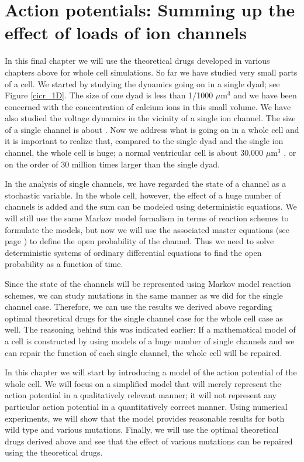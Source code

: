 \chapter[Whole cell action potentials]{Action potentials: Summing up the effect of loads of ion channels \label{ap}}
    
    In this final chapter we will use the theoretical drugs developed in various chapters above for whole cell simulations. So far we have studied very small parts of a cell. We started by studying the dynamics going on in a single dyad; see Figure \ref{cicr_1D}. The size of one dyad is 
less than 1/1000 $\mu \mbox{m}^3$\cite{Bers2001} and we have been concerned with the concentration of calcium ions in this small volume. We have also studied the voltage dynamics in the vicinity of a single ion channel. The size of a single channel is about . Now we address what is going on in a whole cell and it is important to realize that, compared to the single dyad and the single ion channel, the whole cell is huge; a normal ventricular cell is about 30,000 $\mu \mbox{m}^3$  \cite{Bers2001}, or on the order of  30 million times larger than the single dyad.
   
    In the analysis of single channels, we have regarded the state of a channel as a stochastic variable. In the whole cell, however, the effect of a huge number of channels is added and the sum can be modeled using deterministic equations. We will still use the same Markov model formalism in terms of reaction schemes to formulate the models, but now we will use the associated master equations (see page \pageref{master_equation}) to define the open probability of the channel. Thus we need to solve deterministic systems of ordinary differential equations to find the open probability as a function of time.
    
    Since the state of the channels will be represented using Markov model reaction schemes, we can study mutations in the same manner as we did for the single channel case. Therefore, we can use the results we derived above regarding optimal theoretical drugs for the single channel case for the whole cell case as well. The reasoning behind this was indicated earlier: If a mathematical model of a cell is constructed by using models of a huge number of single channels and we can repair the function of each single channel, the whole cell will be repaired.
    
    In this chapter we will start by introducing a model of the action potential of the whole cell. We will focus on a simplified model that will merely represent the action potential in a qualitatively relevant manner; it will not represent any particular action potential in a quantitatively correct manner.   Using numerical experiments, we will show that the model provides reasonable results for both wild type and various mutations. Finally, we will use the optimal theoretical drugs derived above and see that the effect of various mutations can be repaired using the theoretical drugs.

